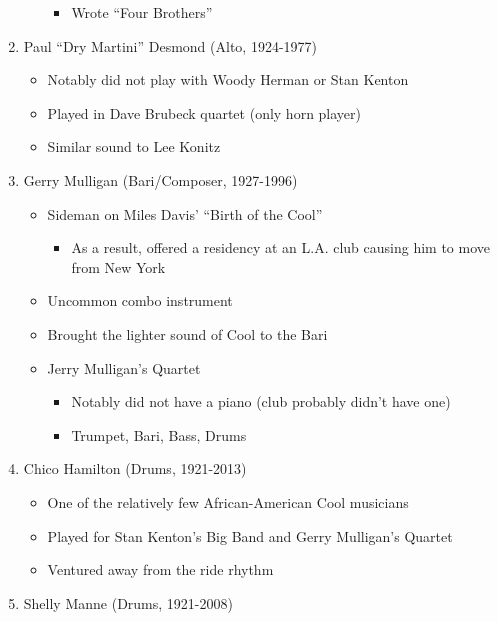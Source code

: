 \documentclass[]{article}
\providecommand{\tightlist}{%
  \setlength{\itemsep}{0pt}\setlength{\parskip}{0pt}}
\begin{document}
\begin{enumerate}
\begin{itemize}
    \begin{itemize}
    \tightlist
    \item
      Wrote ``Four Brothers''
    \end{itemize}
  \end{itemize}
\item
  Paul ``Dry Martini'' Desmond (Alto, 1924-1977)

  \begin{itemize}
  \tightlist
  \item
    Notably did not play with Woody Herman or Stan Kenton
  \item
    Played in Dave Brubeck quartet (only horn player)
  \item
    Similar sound to Lee Konitz
  \end{itemize}
\item
  Gerry Mulligan (Bari/Composer, 1927-1996)

  \begin{itemize}
  \tightlist
  \item
    Sideman on Miles Davis' ``Birth of the Cool''

    \begin{itemize}
    \tightlist
    \item
      As a result, offered a residency at an L.A. club causing him to
      move from New York
    \end{itemize}
  \item
    Uncommon combo instrument
  \item
    Brought the lighter sound of Cool to the Bari
  \item
    Jerry Mulligan's Quartet

    \begin{itemize}
    \tightlist
    \item
      Notably did not have a piano (club probably didn't have one)
    \item
      Trumpet, Bari, Bass, Drums
    \end{itemize}
  \end{itemize}
\item
  Chico Hamilton (Drums, 1921-2013)

  \begin{itemize}
  \tightlist
  \item
    One of the relatively few African-American Cool musicians
  \item
    Played for Stan Kenton's Big Band and Gerry Mulligan's Quartet
  \item
    Ventured away from the ride rhythm
  \end{itemize}
\item
  Shelly Manne (Drums, 1921-2008)


\end{enumerate}
\end{document}
